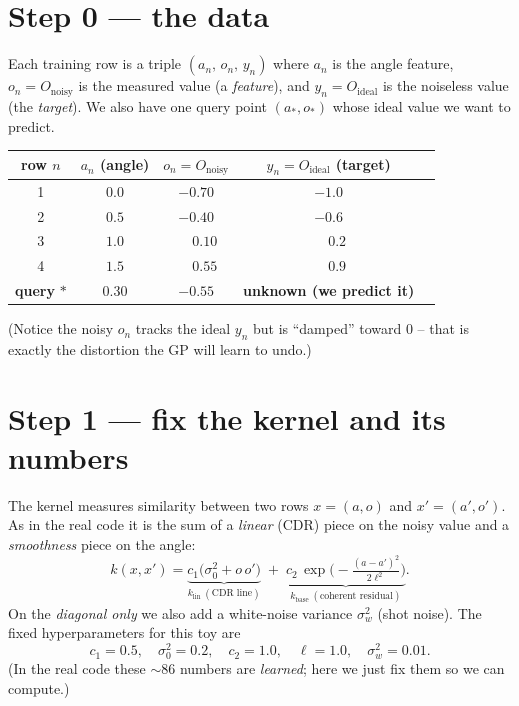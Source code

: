 \documentclass[11pt]{article}
\begin{document}
\section{Step 0 --- the data}

Each training row is a triple $(a_n,\,o_n,\,y_n)$ where $a_n$ is the angle
feature, $o_n=O_{\mathrm{noisy}}$ is the measured value (a \emph{feature}), and
$y_n=O_{\mathrm{ideal}}$ is the noiseless value (the \emph{target}). We also have
one query point $(a_*,o_*)$ whose ideal value we want to predict.

\begin{center}
\renewcommand{\arraystretch}{1.25}
\begin{tabular}{@{}ccccc@{}}
\toprule
row $n$ & $a_n$ (angle) & $o_n=O_{\mathrm{noisy}}$ & $y_n=O_{\mathrm{ideal}}$ (target) \\
\midrule
1 & $0.0$ & $-0.70$ & $-1.0$ \\
2 & $0.5$ & $-0.40$ & $-0.6$ \\
3 & $1.0$ & $\phantom{-}0.10$ & $\phantom{-}0.2$ \\
4 & $1.5$ & $\phantom{-}0.55$ & $\phantom{-}0.9$ \\
\midrule
\textbf{query} $*$ & $0.30$ & $-0.55$ & \textbf{unknown (we predict it)} \\
\bottomrule
\end{tabular}
\end{center}

\noindent
(Notice the noisy $o_n$ tracks the ideal $y_n$ but is ``damped'' toward $0$ --
that is exactly the distortion the GP will learn to undo.)

\section{Step 1 --- fix the kernel and its numbers}

The kernel measures similarity between two rows $x=(a,o)$ and $x'=(a',o')$. As in
the real code it is the sum of a \emph{linear} (CDR) piece on the noisy value and
a \emph{smoothness} piece on the angle:
\begin{equation}
k(x,x')=\underbrace{c_1\big(\sigma_0^2+o\,o'\big)}_{\textstyle k_{\mathrm{lin}}\ (\text{CDR line})}
\;+\;\underbrace{c_2\,\exp\!\Big(-\tfrac{(a-a')^2}{2\ell^2}\Big)}_{\textstyle k_{\mathrm{base}}\ (\text{coherent residual})} .
\label{eq:k}
\end{equation}
On the \emph{diagonal only} we also add a white-noise variance $\sigma_w^2$
(shot noise). The fixed hyperparameters for this toy are
\begin{equation}
c_1=0.5,\quad \sigma_0^2=0.2,\quad c_2=1.0,\quad \ell=1.0,\quad \sigma_w^2=0.01 .
\end{equation}
(In the real code these $\sim\!86$ numbers are \emph{learned}; here we just fix
them so we can compute.)
\end{document}
